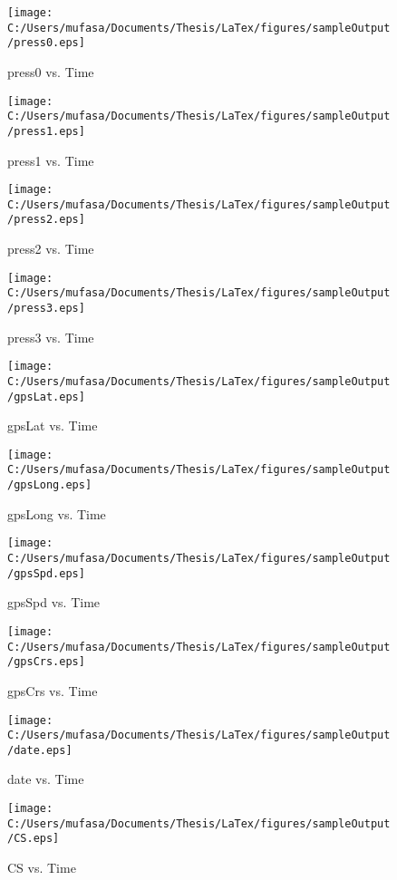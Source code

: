 \begin{figure}[]
	\centering
	\caption{press0 vs. Time}
		\texttt{[image: C:/Users/mufasa/Documents/Thesis/LaTex/figures/sampleOutput/press0.eps]}
\end{figure}
\begin{figure}[]
	\centering
	\caption{press1 vs. Time}
		\texttt{[image: C:/Users/mufasa/Documents/Thesis/LaTex/figures/sampleOutput/press1.eps]}
\end{figure}
\begin{figure}[]
	\centering
	\caption{press2 vs. Time}
		\texttt{[image: C:/Users/mufasa/Documents/Thesis/LaTex/figures/sampleOutput/press2.eps]}
\end{figure}
\begin{figure}[]
	\centering
	\caption{press3 vs. Time}
		\texttt{[image: C:/Users/mufasa/Documents/Thesis/LaTex/figures/sampleOutput/press3.eps]}
\end{figure}
\begin{figure}[]
	\centering
	\caption{gpsLat vs. Time}
		\texttt{[image: C:/Users/mufasa/Documents/Thesis/LaTex/figures/sampleOutput/gpsLat.eps]}
\end{figure}
\begin{figure}[]
	\centering
	\caption{gpsLong vs. Time}
		\texttt{[image: C:/Users/mufasa/Documents/Thesis/LaTex/figures/sampleOutput/gpsLong.eps]}
\end{figure}
\begin{figure}[]
	\centering
	\caption{gpsSpd vs. Time}
		\texttt{[image: C:/Users/mufasa/Documents/Thesis/LaTex/figures/sampleOutput/gpsSpd.eps]}
\end{figure}
\begin{figure}[]
	\centering
	\caption{gpsCrs vs. Time}
		\texttt{[image: C:/Users/mufasa/Documents/Thesis/LaTex/figures/sampleOutput/gpsCrs.eps]}
\end{figure}
\begin{figure}[]
	\centering
	\caption{date vs. Time}
		\texttt{[image: C:/Users/mufasa/Documents/Thesis/LaTex/figures/sampleOutput/date.eps]}
\end{figure}
\begin{figure}[]
	\centering
	\caption{CS vs. Time}
		\texttt{[image: C:/Users/mufasa/Documents/Thesis/LaTex/figures/sampleOutput/CS.eps]}
\end{figure}
